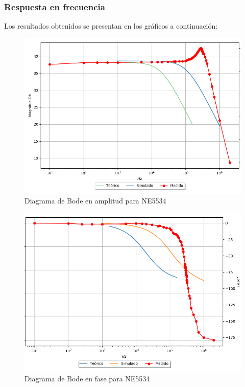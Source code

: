 \subsubsection{Respuesta en frecuencia}
Los resultados obtenidos se presentan en los gráficos a continuación:

\begin{figure}[H]	
	\centering
	\includegraphics[width=\textwidth]{Ejercicio2/Imagenes/Bode_Amp_NE5534.png}
	\caption{Diagrama de Bode en amplitud para NE5534}
	\label{fig:bode_amp_NE5534}
\end{figure}

\begin{figure}[H]	
	\centering
	\includegraphics[width=\textwidth]{Ejercicio2/Imagenes/Bode_Fase_NE5534.png}
	\caption{Diagrama de Bode en fase para NE5534}
	\label{fig:bode_amp_NE5534}
\end{figure}

